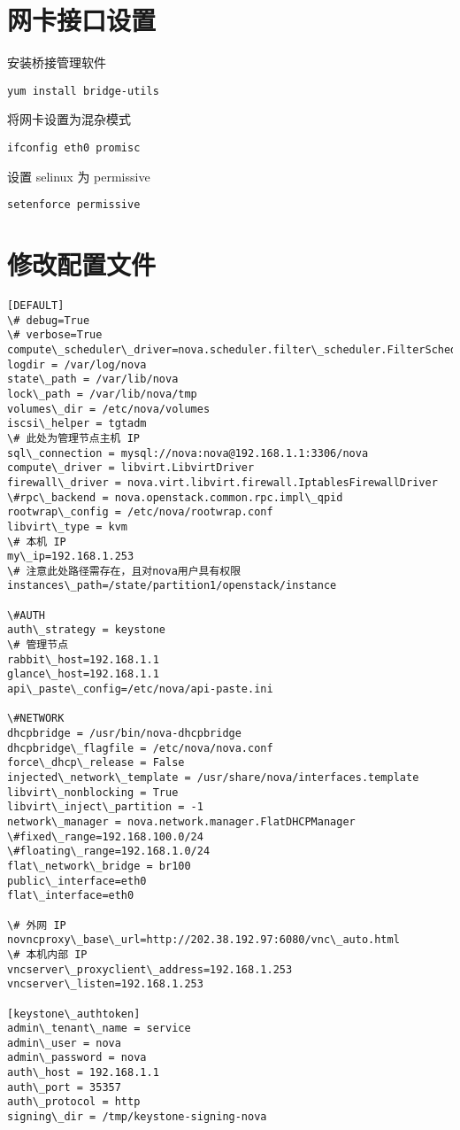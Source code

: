 \documentclass[letterpaper,10pt,english]{sphinxmanual}
\begin{document}
\section{网卡接口设置}
\label{nova_compute:id2}
安装桥接管理软件

\begin{Verbatim}[commandchars=\\\{\}]
yum install bridge-utils
\end{Verbatim}

将网卡设置为混杂模式

\begin{Verbatim}[commandchars=\\\{\}]
ifconfig eth0 promisc
\end{Verbatim}

设置 selinux 为 permissive

\begin{Verbatim}[commandchars=\\\{\}]
setenforce permissive
\end{Verbatim}


\section{修改配置文件}
\label{nova_compute:id3}
\begin{Verbatim}[commandchars=\\\{\}]
[DEFAULT]
\# debug=True
\# verbose=True
compute\_scheduler\_driver=nova.scheduler.filter\_scheduler.FilterScheduler
logdir = /var/log/nova
state\_path = /var/lib/nova
lock\_path = /var/lib/nova/tmp
volumes\_dir = /etc/nova/volumes
iscsi\_helper = tgtadm
\# 此处为管理节点主机 IP
sql\_connection = mysql://nova:nova@192.168.1.1:3306/nova
compute\_driver = libvirt.LibvirtDriver
firewall\_driver = nova.virt.libvirt.firewall.IptablesFirewallDriver
\#rpc\_backend = nova.openstack.common.rpc.impl\_qpid
rootwrap\_config = /etc/nova/rootwrap.conf
libvirt\_type = kvm
\# 本机 IP
my\_ip=192.168.1.253
\# 注意此处路径需存在，且对nova用户具有权限
instances\_path=/state/partition1/openstack/instance

\#AUTH
auth\_strategy = keystone
\# 管理节点
rabbit\_host=192.168.1.1
glance\_host=192.168.1.1
api\_paste\_config=/etc/nova/api-paste.ini

\#NETWORK
dhcpbridge = /usr/bin/nova-dhcpbridge
dhcpbridge\_flagfile = /etc/nova/nova.conf
force\_dhcp\_release = False
injected\_network\_template = /usr/share/nova/interfaces.template
libvirt\_nonblocking = True
libvirt\_inject\_partition = -1
network\_manager = nova.network.manager.FlatDHCPManager
\#fixed\_range=192.168.100.0/24
\#floating\_range=192.168.1.0/24
flat\_network\_bridge = br100
public\_interface=eth0
flat\_interface=eth0

\# 外网 IP
novncproxy\_base\_url=http://202.38.192.97:6080/vnc\_auto.html
\# 本机内部 IP
vncserver\_proxyclient\_address=192.168.1.253
vncserver\_listen=192.168.1.253

[keystone\_authtoken]
admin\_tenant\_name = service
admin\_user = nova
admin\_password = nova
auth\_host = 192.168.1.1
auth\_port = 35357
auth\_protocol = http
signing\_dir = /tmp/keystone-signing-nova
\end{Verbatim}
\end{document}
